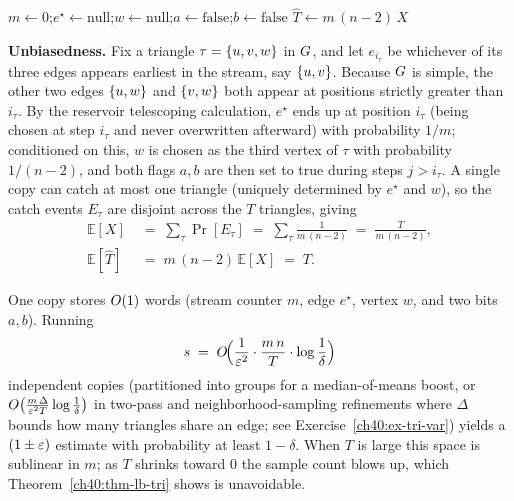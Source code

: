 \begin{algorithm}[H]
\caption{\textsc{TriangleEstimate} (one independent copy)}
\label{ch40:alg-tri}
\DontPrintSemicolon
{}
$m \gets 0$;\quad $e^\star \gets \text{null}$;\quad $w \gets \text{null}$;\quad $a \gets \text{false}$;\quad $b \gets \text{false}$\;
\Return $\widehat T \gets m\,(n-2)\,X$\;
\end{algorithm}

\begin{whybox}
\textbf{Unbiasedness.} Fix a triangle $\tau=\{u,v,w\}$ in $G$, and let
$e_{i_\tau}$ be whichever of its three edges appears earliest in the stream, say
$\{u,v\}$. Because $G$ is simple, the other two edges $\{u,w\}$ and
$\{v,w\}$ both appear at positions strictly greater than $i_\tau$. By the
reservoir telescoping calculation, $e^\star$ ends up at position $i_\tau$ (being
chosen at step $i_\tau$ and never overwritten afterward) with probability
$1/m$; conditioned on this, $w$ is chosen as the third vertex of $\tau$ with
probability $1/(n-2)$, and both flags $a,b$ are then set to true during steps
$j > i_\tau$. A single copy can catch at most one triangle (uniquely determined
by $e^\star$ and $w$), so the catch events $E_\tau$ are disjoint across the $T$
triangles, giving
\begin{align*}
  \mathbb{E}[X]
  &\;=\; \sum_{\tau} \Pr[E_\tau] \;=\; \sum_{\tau} \frac{1}{m\,(n-2)} \;=\; \frac{T}{m\,(n-2)},\\
  \mathbb{E}[\widehat T]
  &\;=\; m\,(n-2)\,\mathbb{E}[X] \;=\; T.
\end{align*}
\end{whybox}

\begin{complexitybox}
One copy stores $O(1)$ words (stream counter $m$, edge $e^\star$, vertex $w$,
and two bits $a,b$). Running
\[
  s \;=\; O\!\Bigl(\frac{1}{\varepsilon^2}\cdot\frac{m\,n}{T}\cdot\log\frac{1}{\delta}\Bigr)
\]
independent copies (partitioned into groups for a median-of-means boost, or
$O\bigl(\frac{m\,\Delta}{\varepsilon^2 T}\log\frac{1}{\delta}\bigr)$ in two-pass and
neighborhood-sampling refinements where $\Delta$ bounds how many triangles share
an edge; see Exercise~\ref{ch40:ex-tri-var}) yields a $(1\pm\varepsilon)$ estimate with probability at
least $1-\delta$. When $T$ is large this space is sublinear in $m$; as $T$
shrinks toward $0$ the sample count blows up, which
Theorem~\ref{ch40:thm-lb-tri} shows is unavoidable.
\end{complexitybox}

